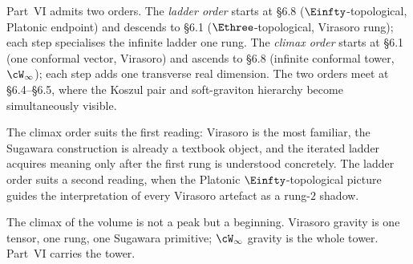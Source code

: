 Part~VI admits two orders. The \emph{ladder order} starts at \S6.8
($\Einfty$-topological, Platonic endpoint) and descends to \S6.1
($\Ethree$-topological, Virasoro rung); each step specialises the
infinite ladder one rung. The \emph{climax order} starts at \S6.1
(one conformal vector, Virasoro) and ascends to \S6.8 (infinite
conformal tower, $\cW_\infty$); each step adds one transverse real
dimension. The two orders meet at \S6.4--\S6.5, where the Koszul
pair and soft-graviton hierarchy become simultaneously visible.

The climax order suits the first reading: Virasoro is the most
familiar, the Sugawara construction is already a textbook object,
and the iterated ladder acquires meaning only after the first rung
is understood concretely. The ladder order suits a second reading,
when the Platonic $\Einfty$-topological picture guides the
interpretation of every Virasoro artefact as a rung-$2$ shadow.

\medskip

The climax of the volume is not a peak but a beginning. Virasoro gravity
is one tensor, one rung, one Sugawara primitive; $\cW_\infty$ gravity is
the whole tower. Part~VI carries the tower.
